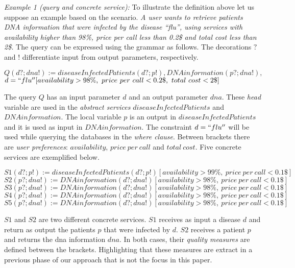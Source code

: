 \bigskip
\noindent \textit{Example 1 (query and concrete service):} To illustrate the definition above let us suppose an example based on the scenario. 
\textit{A user wants to retrieve patients DNA information that were infected by the disease ``flu'', using services with availability higher than 98\%, price per call less than 0.2\$ and total cost less than 2\$.}
The query can be expressed using the grammar as follows. The decorations $?$ and $!$ differentiate input from output parameters, respectively. 
\begin{center}
$Q(d?; dna!) := diseaseInfectedPatients(d?; p!), DNAinformation(p?; dna!),$
\\
$d = ``flu'' [availability > 98\%, \ price \ per \ call < 0.2\$, \ total \ cost < 2\$]$
\end{center}
The query $Q$ has an input parameter $d$ and an output parameter $dna$. 
These \textit{head} variable are used in the \textit{abstract services} $diseaseInfectedPatients$ and $DNAinformation$. 
The local variable $p$ is an output in $diseaseInfectedPatients$ and it is used as input in $DNAinformation$.
The constraint $d = ``flu''$ will be used while querying the databases in the \textit{where clause}.
Between brackets there are \textit{user preferences}: $availability$, $price \ per \ call$ and $total \ cost$.
Five concrete services are exemplified below. 
\begin{center}
\small
$S1(d?; p!) := diseaseInfectedPatients(d?; p!)[availability > 99\%, \ price \ per \ call < 0.1\$]$ 
\\
$S2(p?; dna!) := DNAinformation(d?; dna!)[availability > 98\%, \ price \ per \ call < 0.1\$]$
\\
$S3(p?; dna!) := DNAinformation(d?; dna!)[availability > 98\%, \ price \ per \ call < 0.1\$]$
\\
$S4(p?; dna!) := DNAinformation(d?; dna!)[availability > 98\%, \ price \ per \ call < 0.1\$]$
\\
$S5(p?; dna!) := DNAinformation(d?; dna!)[availability > 98\%, \ price \ per \ call < 0.1\$]$
\end{center}
$S1$ and $S2$ are two different concrete services. $S1$ receives as input a disease $d$ and return as output the patients $p$ that were infected by $d$. 
$S2$ receives a patient $p$ and returns the dna information $dna$. In both cases, their \textit{quality measures} are defined between the brackets. Highlighting that these measures are extract in a previous phase of our approach that is not the focus in this paper.
 

